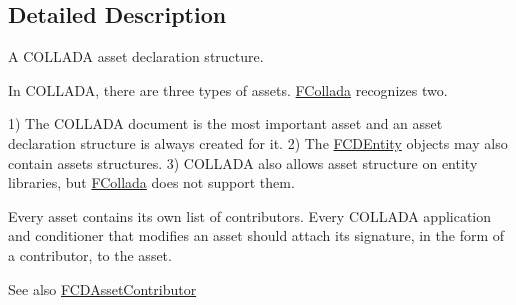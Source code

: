 

\subsection{Detailed Description}
A COLLADA asset declaration structure.

In COLLADA, there are three types of assets. \hyperlink{namespaceFCollada}{FCollada} recognizes two.

1) The COLLADA document is the most important asset and an asset declaration structure is always created for it. 2) The \hyperlink{classFCDEntity}{FCDEntity} objects may also contain assets structures. 3) COLLADA also allows asset structure on entity libraries, but \hyperlink{namespaceFCollada}{FCollada} does not support them.

Every asset contains its own list of contributors. Every COLLADA application and conditioner that modifies an asset should attach its signature, in the form of a contributor, to the asset. \begin{DoxySeeAlso}{See also}
\hyperlink{classFCDAssetContributor}{FCDAssetContributor} 
\end{DoxySeeAlso}


